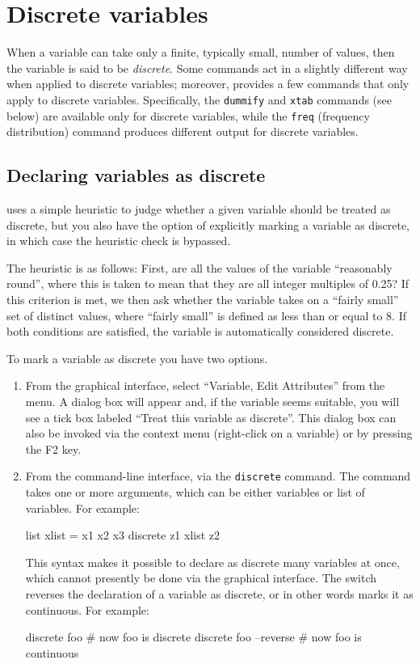 \chapter{Discrete variables}
\label{chap:discrete}

When a variable can take only a finite, typically small, number of
values, then the variable is said to be \emph{discrete}. Some
 commands act in a slightly different way when applied to
discrete variables; moreover,  provides a few commands that
only apply to discrete variables.  Specifically, the \texttt{dummify}
and \texttt{xtab} commands (see below) are available only for discrete
variables, while the \texttt{freq} (frequency distribution) command
produces different output for discrete variables.


\section{Declaring variables as discrete}
\label{discr-declare}

 uses a simple heuristic to judge whether a given variable
should be treated as discrete, but you also have the option of
explicitly marking a variable as discrete, in which case the heuristic
check is bypassed.

The heuristic is as follows: First, are all the values of the variable
``reasonably round'', where this is taken to mean that they are all
integer multiples of 0.25?  If this criterion is met, we then ask
whether the variable takes on a ``fairly small'' set of distinct
values, where ``fairly small'' is defined as less than or equal to 8.
If both conditions are satisfied, the variable is automatically
considered discrete.

To mark a variable as discrete you have two options.
\begin{enumerate}
\item From the graphical interface, select ``Variable, Edit
  Attributes'' from the menu. A dialog box will appear and, if the
  variable seems suitable, you will see a tick box labeled ``Treat
  this variable as discrete''.  This dialog box can also be invoked
  via the context menu (right-click on a variable) or by pressing the
  F2 key.
\item From the command-line interface, via the \texttt{discrete}
  command. The command takes one or more arguments, which can be
  either variables or list of variables. For example:
\begin{code}
list xlist = x1 x2 x3
discrete z1 xlist z2
\end{code}
This syntax makes it possible to declare as discrete many
variables at once, which cannot presently be done via the graphical
interface. The switch  reverses the declaration of a
variable as discrete, or in other words marks it as continuous.
For example:
\begin{code}
discrete foo
# now foo is discrete
discrete foo --reverse
# now foo is continuous
\end{code}
\end{enumerate}

